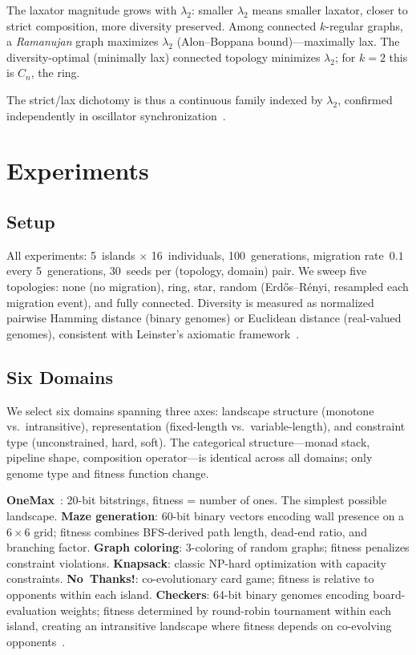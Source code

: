 \documentclass[submission,copyright,creativecommons]{eptcs}
\begin{document}
The laxator magnitude grows with $\lambda_2$: smaller $\lambda_2$
means smaller laxator, closer to strict composition, more diversity
preserved. Among connected $k$-regular graphs, a \emph{Ramanujan}
graph maximizes $\lambda_2$ (Alon--Boppana bound)---maximally lax.
The diversity-optimal (minimally lax) connected topology minimizes
$\lambda_2$; for $k{=}2$ this is $C_n$, the ring.

The strict/lax dichotomy is thus a continuous family indexed by
$\lambda_2$, confirmed independently in oscillator
synchronization~\cite{sanz2026algebraic}.

\section{Experiments}
\label{sec:experiments}

\subsection{Setup}

All experiments: 5~islands $\times$ 16~individuals, 100~generations,
migration rate~$0.1$ every 5~generations, 30~seeds per
(topology, domain) pair. We sweep five topologies: none (no migration),
ring, star, random (Erd\H{o}s--R\'{e}nyi, resampled each migration
event), and fully connected. Diversity is measured as normalized
pairwise Hamming distance (binary genomes) or Euclidean distance
(real-valued genomes), consistent with Leinster's axiomatic
framework~\cite{leinster2021entropy}.

\subsection{Six Domains}

We select six domains spanning three axes: landscape structure
(monotone vs.\ intransitive), representation (fixed-length vs.\
variable-length), and constraint type (unconstrained, hard, soft).
The categorical structure---monad stack, pipeline shape, composition
operator---is identical across all domains; only genome type and
fitness function change.

\textbf{OneMax}~\cite{mitchell1992royal}: 20-bit bitstrings, fitness = number
of ones. The simplest possible landscape.
\textbf{Maze generation}: 60-bit binary vectors encoding wall
presence on a $6 \times 6$ grid; fitness combines BFS-derived path
length, dead-end ratio, and branching factor.
\textbf{Graph coloring}: 3-coloring of random graphs; fitness penalizes
constraint violations.
\textbf{Knapsack}: classic NP-hard optimization with capacity
constraints.
\textbf{No~Thanks!}: co-evolutionary card game; fitness is relative
to opponents within each island.
\textbf{Checkers}: 64-bit binary genomes encoding board-evaluation
weights; fitness determined by round-robin tournament within each
island, creating an intransitive landscape where fitness depends on
co-evolving opponents~\cite{samuel1959checkers}.
\end{document}
